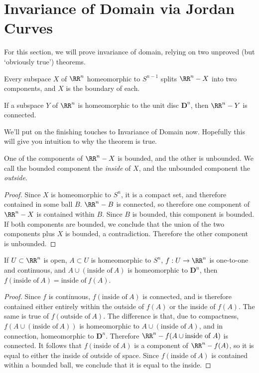 \section{Invariance of Domain via Jordan Curves}

For this section, we will prove invariance of domain, relying on two unproved (but `obviously true') theorems.

\begin{theorem}
    Every subspace $X$ of $\RR^n$ homeomorphic to $S^{n-1}$ splits $\RR^n - X$ into two components, and $X$ is the boundary of each.
\end{theorem}

\begin{theorem}
    If a subspace $Y$ of $\RR^n$ is homeomorphic to the unit disc $\mathbf{D}^n$, then $\RR^n - Y$ is connected.
\end{theorem}

We'll put on the finishing touches to Invariance of Domain now. Hopefully this will give you intuition to why the theorem is true.

\begin{lemma}
    One of the components of $\RR^n - X$ is bounded, and the other is unbounded. We call the bounded component the \emph{inside} of $X$, and the unbounded component the \emph{outside}.
\end{lemma}
\begin{proof}
    Since $X$ is homeomorphic to $S^n$, it is a compact set, and therefore contained in some ball $B$. $\RR^n - B$ is connected, so therefore one component of $\RR^n - X$ is contained within $B$. Since $B$ is bounded, this component is bounded. If both components are bounded, we conclude that the union of the two components plus $X$ is bounded, a contradiction. Therefore the other component is unbounded.
\end{proof}

\begin{lemma}
    If $U \subset \RR^n$ is open, $A \subset U$ is homeomorphic to $S^n$, $f:U \to \RR^n$ is one-to-one and continuous, and $A \cup (\text{inside of}\ A)$ is homeomorphic to $\mathbf{D}^n$, then $f(\text{inside of}\ A) = \text{inside of}\ f(A)$.
\end{lemma}
\begin{proof}
    Since $f$ is continuous, $f(\text{inside of}\ A)$ is connected, and is therefore contained either entirely within the outside of $f(A)$ or the inside of $f(A)$. The same is true of $f(\text{outside of}\ A)$. The difference is that, due to compactness, $f(A \cup (\text{inside of}\ A))$ is homeomorphic to $A \cup (\text{inside of}\ A)$, and in connection, homeomorphic to $\mathbf{D}^n$. Therefore $\RR^n - f(A \cup \text{inside of}\ A)$ is connected. It follows that $f(\text{inside of}\ A)$ is a component of $\RR^n - f(A)$, so it is equal to either the inside of outside of space. Since $f(\text{inside of}\ A)$ is contained within a bounded ball, we conclude that it is equal to the inside.
\end{proof}

